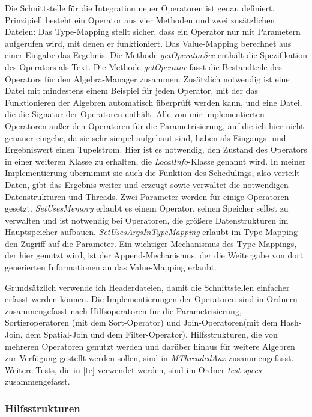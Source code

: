 \documentclass[a4paper,12pt,twoside]{article}
\newcommand{\Fb}[1]{\textit{#1}} %
\begin{document}
Die Schnittstelle für die Integration neuer Operatoren ist genau definiert. Prinzipiell besteht ein Operator aus vier Methoden und zwei zusätzlichen Dateien: Das Type-Mapping stellt sicher, dass ein Operator nur mit Parametern aufgerufen wird, mit denen er funktioniert. Das Value-Mapping berechnet aus einer Eingabe das Ergebnis. Die Methode \Fb{getOperatorSec} enthält die Spezifikation des Operators als Text. Die Methode \Fb{getOperator} fasst die Bestandteile des Operators für den Algebra-Manager zusammen. Zusätzlich notwendig ist eine Datei mit mindestens einem Beispiel für jeden Operator, mit der das Funktionieren der Algebren automatisch überprüft werden kann, und eine Datei, die die Signatur der Operatoren enthält. Alle von mir implementierten Operatoren außer den Operatoren für die Parametrisierung, auf die ich hier nicht genauer eingehe, da sie sehr simpel aufgebaut sind, haben als Eingangs- und Ergebniswert einen Tupelstrom. Hier ist es notwendig, den Zustand des Operators in einer weiteren Klasse zu erhalten, die \Fb{LocalInfo}-Klasse genannt wird. In meiner Implementierung übernimmt sie auch die Funktion des Schedulings, also verteilt Daten, gibt das Ergebnis weiter und erzeugt sowie verwaltet die notwendigen Datenstrukturen und Threads. Zwei Parameter werden für einige Operatoren gesetzt. \Fb{SetUsesMemory} erlaubt es einem Operator, seinen Speicher selbst zu verwalten und ist notwendig bei Operatoren, die größere Datenstrukturen im Hauptspeicher aufbauen. \Fb{SetUsesArgsInTypeMapping} erlaubt im Type-Mapping den Zugriff auf die Parameter. Ein wichtiger Mechanismus des Type-Mappings, der hier genutzt wird, ist der Append-Mechanismus, der die Weitergabe von dort generierten Informationen an das Value-Mapping erlaubt.

Grundsätzlich verwende ich Headerdateien, damit die Schnittstellen einfacher erfasst werden können. Die Implementierungen der Operatoren sind in Ordnern zusammengefasst nach Hilfsoperatoren für die Parametrisierung, Sortieroperatoren (mit dem Sort-Operator) und Join-Operatoren(mit dem Hash-Join, dem Spatial-Join und dem Filter-Operator). Hilfsstrukturen, die von mehreren Operatoren genutzt werden und darüber hinaus für weitere Algebren zur Verfügung gestellt werden sollen, sind in \Fb{MThreadedAux} zusammengefasst. Weitere Tests, die in \autoref{te} verwendet werden, sind im Ordner \Fb{test-specs} zusammengefasst.

\subsubsection{Hilfsstrukturen}
\label{Hilfsstrukturen} 
\end{document}
